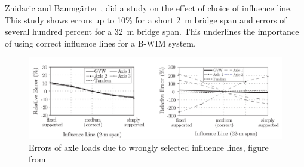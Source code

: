 Znidaric and Baumgärter \cite{bwim_an_overview}, did a study on the effect of choice of influence line. This study shows errors up to 10\% for a short \SI{2}{\metre} bridge span and errors of several hundred percent for a \SI{32}{\metre} bridge span. This underlines the importance of using correct influence lines for a B-WIM system.
\begin{figure}[h]
\centering
\includegraphics[scale=0.5]{figures/error_in_weights_dueTo_infl}
\caption{Errors of axle loads due to wrongly selected influence lines, figure from \cite{Quilligan}}
\label{fig:errorOfInfl}
\end{figure}
